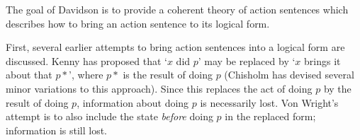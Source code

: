 \documentclass{article}
\begin{document}
\maketitle

The goal of Davidson is to provide a coherent theory of action sentences which
describes how to bring an action sentence to its logical form.

First, several earlier attempts to bring action sentences into a logical form
are discussed. Kenny has proposed that `$x$ did $p$' may be replaced by
`$x$ brings it about that $p*$', where $p*$ is the result of doing $p$ (Chisholm
has devised several minor variations to this approach). Since this replaces
the act of doing $p$ by the result of doing $p$, information about doing $p$
is necessarily lost. Von Wright's attempt is to also include the state
\emph{before} doing $p$ in the replaced form; information is still lost.
\end{document}
